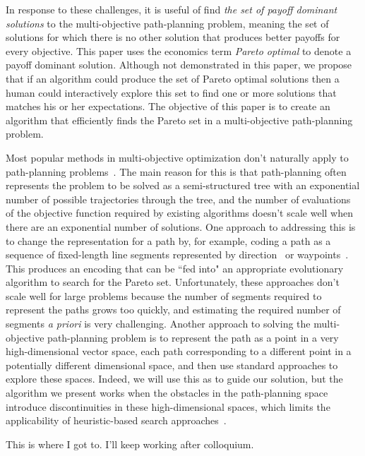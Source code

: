 \documentclass[conference]{IEEEtran}
\begin{document}
In response to these challenges, it is useful of find {\em the set of payoff dominant solutions} to the multi-objective path-planning problem, meaning the set of solutions for which there is no other solution that produces better payoffs for every objective.   
This paper uses the economics term {\em Pareto optimal} to denote a payoff dominant solution.  Although not demonstrated in this paper, we propose that if an algorithm could produce the set of Pareto optimal solutions then a human could interactively explore this set to find one or more solutions that matches his or her expectations. 
The objective of this paper is to create an algorithm that efficiently finds the Pareto set in a multi-objective path-planning problem.

Most popular methods in multi-objective optimization don't naturally apply to path-planning problems~\cite{4358754, Ahmed2013}.
The main reason for this is that path-planning often represents the problem to be solved as a semi-structured tree with an exponential number of possible trajectories through the tree, and the number of evaluations of the objective function required by existing algorithms doesn't scale well when there are an exponential number of solutions. 
One approach to addressing this is to change the representation for a path by, for example, coding a path as a sequence of fixed-length line segments represented by direction~\cite{Ahmed2013,howlett2006learning} or waypoints~\cite{5160222,Pires2004}.  
This produces an encoding that can be ``fed into" an appropriate evolutionary algorithm to search for the Pareto set. 
Unfortunately, these approaches don't scale well for large problems because the number of segments required to represent the paths grows too quickly, and estimating the required number of segments {\em a priori} is very challenging.  
Another approach to solving the multi-objective path-planning problem is to represent the path as a point in a very high-dimensional vector space, each path corresponding to a different point in a potentially different dimensional space, and then use standard approaches to explore these spaces. 
Indeed, we will use this as to guide our solution, but the algorithm we present works when the obstacles in the path-planning space introduce discontinuities in these high-dimensional spaces, which limits the applicability of heuristic-based search approaches~\cite{5160222,4358754}.

{\sc This is where I got to. I'll keep working after colloquium.}
\end{document}
